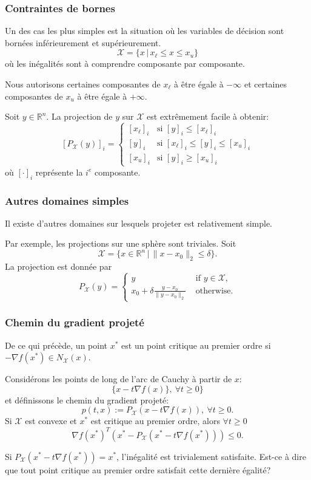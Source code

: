 \documentclass[t,usepdftitle=false]{beamer}
\def\cX{\mathcal{X}}
\begin{document}
\begin{frame}
\frametitle{Contraintes de bornes}

Un des cas les plus simples est la situation où les variables de décision sont bornées inférieurement et supérieurement.
$$
\cX = \lbrace x \,|\, x_{\ell} \leq x \leq x_u \rbrace
$$
où les inégalités sont à comprendre composante par composante.

\mbox{}

Nous autorisons certaines composantes de $x_{\ell}$ à être égale à $-\infty$ et certaines composantes de $x_u$ à être égale à $+\infty$.

\mbox{}

Soit $y \in \mathbb{R}^n$. La projection de $y$ sur $\cX$ est extrêmement facile à obtenir:
$$
[P_{\cX}(y)]_i =
\begin{cases}
[x_{\ell}]_i & \mbox{si } [y]_i \leq [x_{\ell}]_i \\
[y]_i & \mbox{si } [x_{\ell}]_i \leq [y]_i \leq [x_u]_i \\
[x_u]_i & \mbox{si } [y]_i \geq [x_u]_i
\end{cases}
$$
où $[\cdot]_i$ représente la $i^e$ composante.

\end{frame}

\begin{frame}
\frametitle{Autres domaines simples}

Il existe d'autres domaines sur lesquels projeter est relativement simple.

\mbox{}

Par exemple, les projections sur une sphère sont triviales.
Soit
$$
\cX = \lbrace x \in \mathbb{R}^n \,|\, \| x - x_0 \|_2 \leq \delta \rbrace.
$$
La projection est donnée par
$$
P_{\cX}(y) =
\begin{cases}
y & \mbox{ if } y \in \cX, \\
x_0 + \delta \frac{y - x_0}{\| y - x_0 \|_2} & \mbox{ otherwise.}
\end{cases}
$$

\end{frame}

\begin{frame}
\frametitle{Chemin du gradient projeté}

De ce qui précède, un point $x^*$ est un point critique au premier ordre si $-\nabla f(x^*) \in N_{\cX}(x)$.

\mbox{}

Considérons les points de long de l'arc de Cauchy à partir de $x$:
$$
\lbrace x-t\nabla f(x) \rbrace, \ \forall t \geq 0 \rbrace
$$
et définissons le chemin du gradient projeté:
$$
p(t,x) := P_{\cX}(x-t\nabla f(x)), \ \forall t \geq 0.
$$
Si $\cX$ est convexe et $x^*$ est critique au premier ordre, alors
$\forall t \geq 0$
$$
\nabla f(x^*)^T(x^*-P_{\cX}(x^*-t\nabla f(x^*))) \leq 0.
$$

\mbox{}

Si $P_{\cX}(x^*-t\nabla f(x^*)) = x^*$, l'inégalité est trivialement satisfaite. Est-ce à dire que tout point critique au premier ordre satisfait cette dernière égalité?

\end{frame}
\end{document}
